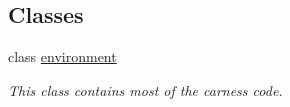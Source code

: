 \subsection*{Classes}
\begin{DoxyCompactItemize}
\item 
class \hyperlink{a00003}{environment}
\begin{DoxyCompactList}\small\item\em This class contains most of the carness code. \end{DoxyCompactList}\end{DoxyCompactItemize}
